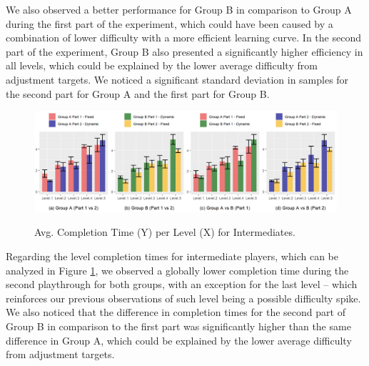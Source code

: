 We also observed a better performance for Group B in comparison to Group A during the first part of the experiment, which could have been caused by a combination of lower difficulty with a more efficient learning curve. In the second part of the experiment, Group B also presented a significantly higher efficiency in all levels, which could be explained by the lower average difficulty from adjustment targets. We noticed a significant standard deviation in samples for the second part for Group A and the first part for Group B.

\begin{figure}[!ht]
    \begin{center}
    \caption{Avg. Completion Time (Y) per Level (X) for Intermediates.}
        \includegraphics[width=\textwidth]{figures/completion_time-intermediate_players.png}
        \label{fig:result-metric-intermediates-completion-time}
    \end{center}
\end{figure}

Regarding the level completion times for intermediate players, which can be analyzed in Figure \ref{fig:result-metric-intermediates-completion-time}, we observed a globally lower completion time during the second playthrough for both groups, with an exception for the last level -- which reinforces our previous observations of such level being a possible difficulty spike. We also noticed that the difference in completion times for the second part of Group B in comparison to the first part was significantly higher than the same difference in Group A, which could be explained by the lower average difficulty from adjustment targets.

